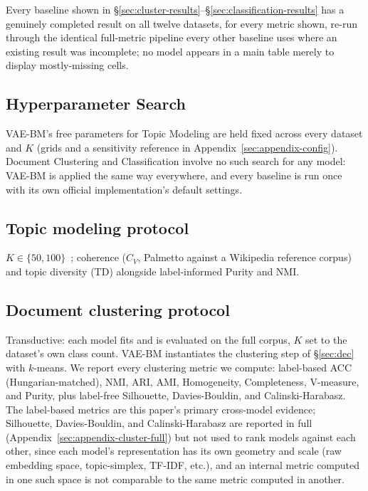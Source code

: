 \documentclass[11pt]{article}
\begin{document}
Every baseline shown in \S\ref{sec:cluster-results}--\S\ref{sec:classification-results} has a genuinely completed result on all twelve datasets, for every metric shown, re-run through the identical full-metric pipeline every other baseline uses where an existing result was incomplete; no model appears in a main table merely to display mostly-missing cells.

\subsection{Hyperparameter Search}
\label{sec:hp-search}
VAE-BM's free parameters for Topic Modeling are held fixed across every dataset and $K$ (grids and a sensitivity reference in Appendix~\ref{sec:appendix-config}). Document Clustering and Classification involve no such search for any model: VAE-BM is applied the same way everywhere, and every baseline is run once with its own official implementation's default settings.

\subsection{Topic modeling protocol}
$K\in\{50,100\}$~\citep{wu2023ecrtm,hicot2025}; coherence ($C_V$, Palmetto against a Wikipedia reference corpus) and topic diversity (TD) alongside label-informed Purity and NMI.

\subsection{Document clustering protocol}
Transductive: each model fits and is evaluated on the full corpus, $K$ set to the dataset's own class count. VAE-BM instantiates the clustering step of \S\ref{sec:dec} with $k$-means. We report every clustering metric we compute: label-based ACC (Hungarian-matched), NMI, ARI, AMI, Homogeneity, Completeness, V-measure, and Purity, plus label-free Silhouette, Davies-Bouldin, and Calinski-Harabasz. The label-based metrics are this paper's primary cross-model evidence; Silhouette, Davies-Bouldin, and Calinski-Harabasz are reported in full (Appendix~\ref{sec:appendix-cluster-full}) but not used to rank models against each other, since each model's representation has its own geometry and scale (raw embedding space, topic-simplex, TF-IDF, etc.), and an internal metric computed in one such space is not comparable to the same metric computed in another.
\end{document}
